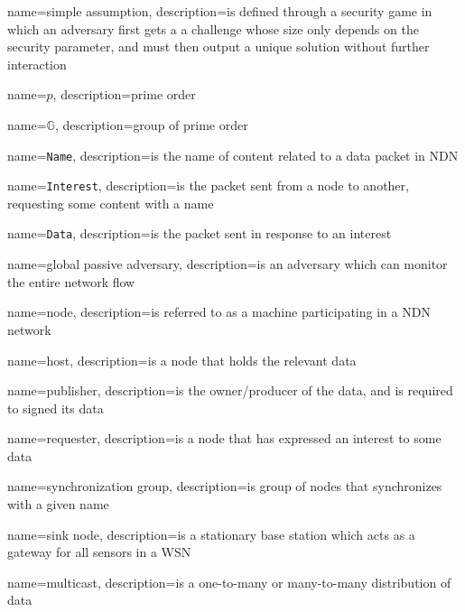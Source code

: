 {
  name=simple assumption,
  description={is defined through a security game in which an adversary first gets a a challenge whose size only depends on the security
  parameter, and must then output a unique solution without further interaction~\cite{DBLP:conf/pkc/HofheinzKS15}}
}

{
  name=$p$,
  description={prime order}
}

{
  name=$\mathbb{G}$,
  description={group of prime order}
}

{
  name=\texttt{Name},
  description={is the name of content related to a \gls{data} packet in NDN}
}

{
  name=\texttt{Interest},
  description={is the packet sent from a node to another, requesting some content with a \gls{name}}
}


{
  name=\texttt{Data},
  description={is the packet sent in response to an \gls{interest}}
}

{
  name=global passive adversary,
  description={is an adversary which can monitor the entire network flow}
}

{
  name=node,
  description={is referred to as a machine participating in a NDN network}
}

{
  name=host,
  description={is a node that holds the relevant \gls{data}}
}

{
  name=publisher,
  description={is the owner/producer of the \gls{data}, and is required to signed its \gls{data}}
}

{
  name=requester,
  description={is a node that has expressed an \gls{interest} to some \gls{data}}
}

{
  name=synchronization group,
  description={is group of nodes that synchronizes with a given \gls{name}}
}

{
  name=sink node,
  description={is a stationary base station which acts as a gateway for all sensors in a WSN~\cite[Section 1.1]{Patil:2012:SWS:2464778}}
}

{
  name=multicast,
  description={is a one-to-many or many-to-many distribution of \gls{data}}
}